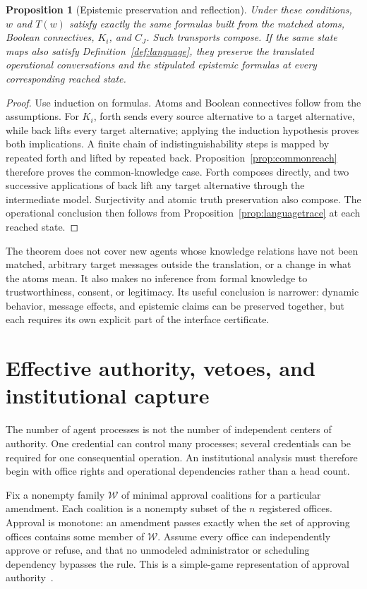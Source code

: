 \documentclass[11pt,letterpaper]{article}
\theoremstyle{plain}
\newtheorem{proposition}{Proposition}[section]
\theoremstyle{definition}
\theoremstyle{remark}
\begin{document}
\begin{proposition}[Epistemic preservation and reflection]\label{prop:epistemictransport}
Under these conditions, $w$ and $T(w)$ satisfy exactly the same formulas built from the matched atoms, Boolean connectives, $K_i$, and $C_J$. Such transports compose. If the same state maps also satisfy Definition~\ref{def:language}, they preserve the translated operational conversations and the stipulated epistemic formulas at every corresponding reached state.
\end{proposition}
\begin{proof}
Use induction on formulas. Atoms and Boolean connectives follow from the assumptions. For $K_i$, forth sends every source alternative to a target alternative, while back lifts every target alternative; applying the induction hypothesis proves both implications. A finite chain of indistinguishability steps is mapped by repeated forth and lifted by repeated back. Proposition~\ref{prop:commonreach} therefore proves the common-knowledge case. Forth composes directly, and two successive applications of back lift any target alternative through the intermediate model. Surjectivity and atomic truth preservation also compose. The operational conclusion then follows from Proposition~\ref{prop:languagetrace} at each reached state.
\end{proof}

The theorem does not cover new agents whose knowledge relations have not been matched, arbitrary target messages outside the translation, or a change in what the atoms mean. It also makes no inference from formal knowledge to trustworthiness, consent, or legitimacy. Its useful conclusion is narrower: dynamic behavior, message effects, and epistemic claims can be preserved together, but each requires its own explicit part of the interface certificate.

\section{Effective authority, vetoes, and institutional capture}\label{sec:power}
The number of agent processes is not the number of independent centers of authority. One credential can control many processes; several credentials can be required for one consequential operation. An institutional analysis must therefore begin with office rights and operational dependencies rather than a head count.

Fix a nonempty family $\mathcal W$ of minimal approval coalitions for a particular amendment. Each coalition is a nonempty subset of the $n$ registered offices. Approval is monotone: an amendment passes exactly when the set of approving offices contains some member of $\mathcal W$. Assume every office can independently approve or refuse, and that no unmodeled administrator or scheduling dependency bypasses the rule. This is a simple-game representation of approval authority~\cite{taylorzwicker}.
\end{document}
